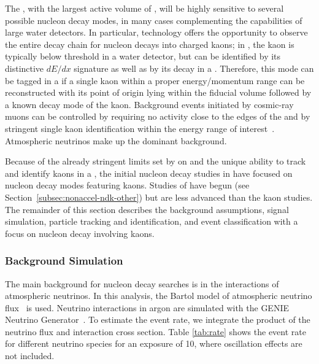 The  , with the largest active volume of , 
will be highly sensitive to several possible nucleon decay modes, 
in many cases complementing the capabilities of large water detectors.
In particular,  technology offers the opportunity to observe the entire decay chain for nucleon decays into charged kaons; in \ptoknubar, the kaon is typically below \cherenkov threshold in a water \cherenkov detector, but can be identified by its distinctive $dE/dx$ signature as well as by its decay in a .
Therefore, this mode can be tagged in a  if a single kaon within a proper energy/momentum range can be reconstructed with its point of origin lying within the fiducial volume followed by a known decay mode of the kaon.
Background events initiated by cosmic-ray muons can be controlled  by requiring no activity close to the edges of the  and by stringent single kaon identification within the energy range of interest~\cite{bib:docdb3384,bib:docdb1752}.  Atmospheric neutrinos make up the dominant background.

Because of the already stringent limits set by \superk on \ptoepizero and the unique ability to track and identify kaons in a , the initial nucleon decay studies in  have focused on nucleon decay modes featuring kaons.  Studies of \ptoepizero have begun (see Section~\ref{subsec:nonaccel-ndk-other}) but are less advanced than the kaon studies.  The remainder of this section describes the background assumptions, signal simulation, particle tracking and identification, and event classification with a focus on nucleon decay involving kaons.

\subsubsection{Background Simulation}
\label{sec:ndkbkgd}

The main background for nucleon decay searches is in the interactions of  atmospheric neutrinos. In this analysis, the Bartol model of atmospheric neutrino flux~\cite{Barr:2004br} is used.
Neutrino interactions in argon are simulated with the GENIE Neutrino  Generator~\cite{Andreopoulos:2009rq}. To estimate the event rate, we integrate the product of the neutrino flux and interaction cross section.
Table \ref{tab:rate} shows the event rate for different neutrino species for an exposure of \SI{10}{\ktyr}, where oscillation effects are not included.

